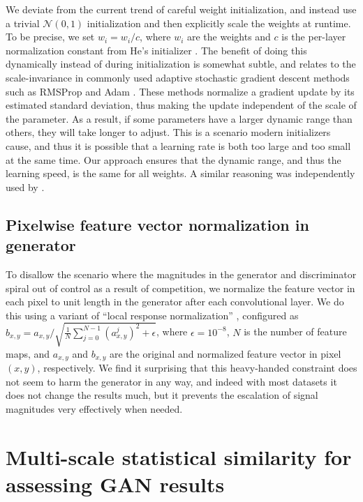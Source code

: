 \documentclass{article}
\begin{document}
We deviate from the current trend of careful weight initialization, and instead use a trivial $\mathcal{N}(0,1)$ initialization and then explicitly scale the weights at runtime. To be precise, we set $\hat{w}_i = w_i / c$, where $w_i$ are the weights and $c$ is the per-layer normalization constant from He's initializer \citep{He2015}. The benefit of doing this dynamically instead of during initialization is somewhat subtle, and relates to the scale-invariance in commonly used adaptive stochastic gradient descent methods such as RMSProp \citep{rmsprop} and Adam \citep{adam}. These methods normalize a gradient update by its estimated standard deviation, thus making the update independent of the scale of the parameter. As a result, if some parameters have a larger dynamic range than others, they will take longer to adjust. This is a scenario modern initializers cause, and thus it is possible that a learning rate is both too large and too small at the same time. Our approach ensures that the dynamic range, and thus the learning speed, is the same for all weights. A similar reasoning was independently used by \cite{Laarhoven2017}.

\subsection{Pixelwise feature vector normalization in generator}
\label{sec:featurenorm}

To disallow the scenario where the magnitudes in the generator and discriminator spiral out of control as a result of competition, we normalize the feature vector in each pixel to unit length in the generator after each convolutional layer. We do this using a variant of ``local response normalization'' \citep{Krizhevsky2012}, configured as
$b_{x,y} = a_{x,y} / \sqrt{\frac{1}{N} \sum_{j=0}^{N-1} (a^j_{x,y})^2 + \epsilon}$,
where $\epsilon=10^{-8}$, $N$ is the number of feature maps, and $a_{x,y}$ and $b_{x,y}$ are the original and normalized feature vector in pixel $(x,y)$, respectively. We find it surprising that this heavy-handed  constraint does not seem to harm the generator in any way, and indeed with most datasets it does not change the results much, but it prevents the escalation of signal magnitudes very effectively when needed.

\section{Multi-scale statistical similarity for assessing GAN results}
\label{sec:metric}
\end{document}
